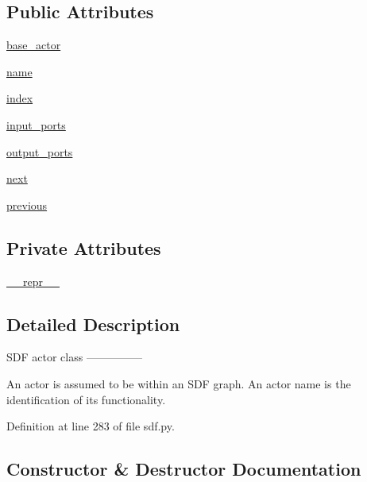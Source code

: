 \subsection*{Public Attributes}
\begin{DoxyCompactItemize}
\item 
\hyperlink{classsylva_1_1base_1_1sdf_1_1actor_ae9b1e79fcf5e63107ae89ba68ecc4743}{base\+\_\+actor}
\item 
\hyperlink{classsylva_1_1base_1_1sdf_1_1actor_a2ef1df32bd9d891a43df5b59cdc2f33b}{name}
\item 
\hyperlink{classsylva_1_1base_1_1sdf_1_1actor_a876d41fa48c3a1a6d62fc3054b321f08}{index}
\item 
\hyperlink{classsylva_1_1base_1_1sdf_1_1actor_aad8739c0c518eb7017949d07effee1b2}{input\+\_\+ports}
\item 
\hyperlink{classsylva_1_1base_1_1sdf_1_1actor_aa145dfb1abe65febe991235fb715f44e}{output\+\_\+ports}
\item 
\hyperlink{classsylva_1_1base_1_1sdf_1_1actor_aa182473926fcf5c58d284b5f23351629}{next}
\item 
\hyperlink{classsylva_1_1base_1_1sdf_1_1actor_ac3043c8e8aa528bb6d00465b0a1964d3}{previous}
\end{DoxyCompactItemize}
\subsection*{Private Attributes}
\begin{DoxyCompactItemize}
\item 
\hyperlink{classsylva_1_1base_1_1sdf_1_1actor_a3f5b51bf4c0ca79d2086bc8036b4651e}{\+\_\+\+\_\+repr\+\_\+\+\_\+}
\end{DoxyCompactItemize}


\subsection{Detailed Description}
\begin{DoxyVerb}  SDF actor class
  ---------------

  An actor is assumed to be within an SDF graph.
  An actor name is the identification of its functionality.
\end{DoxyVerb}
 

Definition at line 283 of file sdf.\+py.



\subsection{Constructor \& Destructor Documentation}
\mbox{\label{classsylva_1_1base_1_1sdf_1_1actor_a54b20a91faff7f7d083257c95d6768d0}} 
